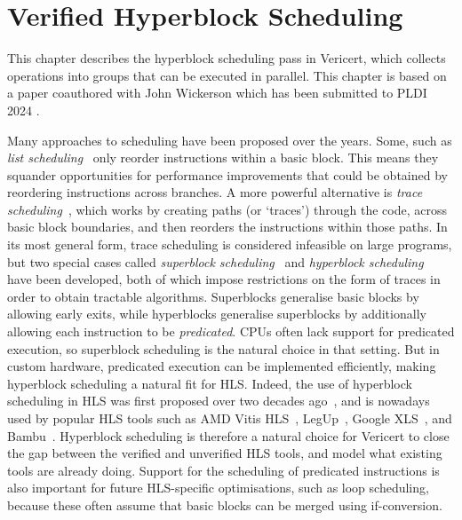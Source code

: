 \graphicspath{{./figures/5-hyperblock-scheduling/}}

\chapter{Verified Hyperblock Scheduling}%
\label{sec:hyperblock-scheduling}

\begin{chapsummary}
  This chapter describes the hyperblock scheduling pass in Vericert, which
  collects operations into groups that can be executed in parallel.  This
  chapter is based on a paper coauthored with John Wickerson which has been
  submitted to PLDI 2024 \cite[]{herklotz24_hsvhls}.
\end{chapsummary}

\noindent Many approaches to scheduling have been proposed over the years. Some, such as
\emph{\gls{list scheduling}}~\cite[][p.~257]{baker19_princ} only reorder instructions
within a basic block. This means they squander opportunities for performance
improvements that could be obtained by reordering instructions across
branches. A more powerful alternative is \emph{trace
  scheduling}~\cite{ellis85_bulld, fisher81_trace_sched}, which works by
creating paths (or `traces') through the code, across basic block boundaries,
and then reorders the instructions within those paths. In its most general
form, trace scheduling is considered infeasible on large programs, but two
special cases called \emph{superblock scheduling}~\cite{hwu93_super} and
\emph{hyperblock
  scheduling}~\cite{mahlke92_effec_compil_suppor_predic_execut_using_hyper} have
been developed, both of which impose restrictions on the form of traces in order
to obtain tractable algorithms. Superblocks generalise basic blocks by allowing
early exits, while hyperblocks generalise superblocks by additionally allowing each instruction to be \emph{predicated}. CPUs often lack support for predicated execution, so superblock scheduling is the natural choice in that setting.
But in custom hardware, predicated execution can be implemented efficiently, making hyperblock scheduling a natural fit for HLS.
Indeed, the use of
hyperblock scheduling in HLS was first proposed over two decades
ago~\cite{budiu02_compil_applic_specif_hardw,
  callahan98_instr_level_paral_recon_comput}, and is nowadays used by popular
HLS tools such as AMD Vitis
HLS~\cite{amd23_vitis_forum},  LegUp~\cite[][p.~60]{canis15_legup}, Google XLS~\cite[line~112]{google23_xls_uses_smt}, and Bambu~\cite[line~304]{ferrandi14_panda_bambu}.
Hyperblock scheduling is therefore a natural choice for Vericert to close the gap between the verified and unverified HLS tools, and model what existing tools are already doing.  Support for the scheduling of predicated instructions is also important for future HLS-specific optimisations, such as loop scheduling, because these often assume that basic blocks can be merged using if-conversion.

